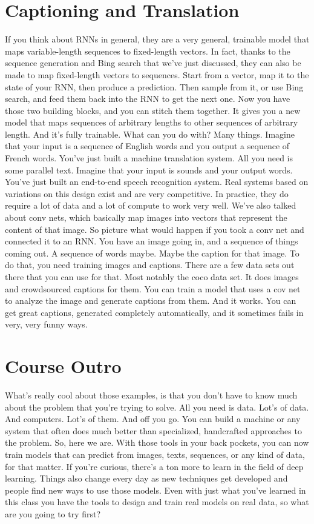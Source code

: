 \documentclass{article}
\begin{document}
\section{Captioning and Translation}
If you think about RNNs in general,
they are a very general, trainable model
that maps variable-length
sequences to fixed-length vectors.
In fact, thanks to the sequence
generation and Bing search that we've
just discussed, they can also be made to
map fixed-length vectors to sequences.
Start from a vector, map it to the state
of your RNN, then produce a prediction.
Then sample from it,
or use Bing search, and
feed them back into the RNN
to get the next one.
Now you have those two building blocks,
and you can stitch them together.
It gives you a new model that maps
sequences of arbitrary lengths to other
sequences of arbitrary length.
And it's fully trainable.
What can you do with?
Many things.
Imagine that your input is
a sequence of English words and
you output a sequence of French words.
You've just built a machine
translation system.
All you need is some parallel text.
Imagine that your input is sounds and
your output words.
You've just built an end-to-end
speech recognition system.
Real systems based on variations on this
design exist and are very competitive.
In practice,
they do require a lot of data and
a lot of compute to work very well.
We've also talked about conv nets,
which basically map images
into vectors that represent
the content of that image.
So picture what would happen if you took
a conv net and connected it to an RNN.
You have an image going in, and
a sequence of things coming out.
A sequence of words maybe.
Maybe the caption for that image.
To do that,
you need training images and captions.
There are a few data sets out
there that you can use for that.
Most notably the coco data set.
It does images and
crowdsourced captions for them.
You can train a model that uses
a cov net to analyze the image and
generate captions from them.
And it works.
You can get great captions,
generated completely automatically, and
it sometimes fails in very,
very funny ways.
\section{Course Outro}
What's really cool about those examples,
is that you don't have to know much
about the problem that
you're trying to solve.
All you need is data.
Lot's of data.
And computers.
Lot's of them.
And off you go.
You can build a machine or
any system that often does much
better than specialized,
handcrafted approaches to the problem.
So, here we are.
With those tools in your back pockets,
you can now train models that can
predict from images, texts, sequences,
or any kind of data, for that matter.
If you're curious, there's a ton more
to learn in the field of deep learning.
Things also change every day as
new techniques get developed and
people find new ways
to use those models.
Even with just what you've learned in
this class you have the tools to design
and train real models on real data,
so what are you going to try first?
\end{document}
